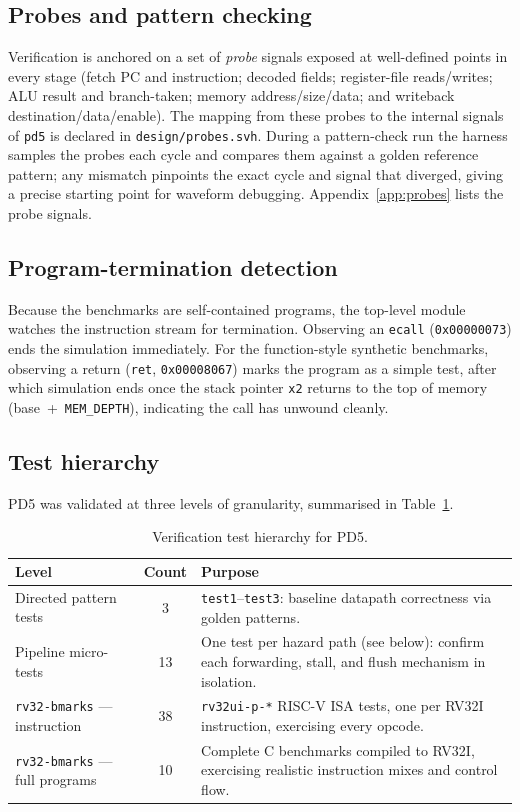 \documentclass[11pt,a4paper]{article}
\newcommand{\code}[1]{\texttt{#1}}          %
\newcommand{\sig}[1]{\texttt{#1}}
\newcommand{\hex}[1]{\texttt{0x#1}}
\begin{document}
\subsection{Probes and pattern checking}
Verification is anchored on a set of \emph{probe} signals exposed at well-defined points in
every stage (fetch PC and instruction; decoded fields; register-file reads/writes; ALU
result and branch-taken; memory address/size/data; and writeback destination/data/enable).
The mapping from these probes to the internal signals of \code{pd5} is declared in
\code{design/probes.svh}. During a pattern-check run the harness samples the probes each
cycle and compares them against a golden reference pattern; any mismatch pinpoints the
exact cycle and signal that diverged, giving a precise starting point for waveform
debugging. Appendix~\ref{app:probes} lists the probe signals.

\subsection{Program-termination detection}
Because the benchmarks are self-contained programs, the top-level module watches the
instruction stream for termination. Observing an \sig{ecall} (\hex{00000073}) ends the
simulation immediately. For the function-style synthetic benchmarks, observing a return
(\sig{ret}, \hex{00008067}) marks the program as a simple test, after which simulation ends
once the stack pointer \sig{x2} returns to the top of memory (base~+~\code{MEM\_DEPTH}),
indicating the call has unwound cleanly.

\subsection{Test hierarchy}
PD5 was validated at three levels of granularity, summarised in Table~\ref{tab:tests}.

\begin{table}[h]
\centering
\caption{Verification test hierarchy for PD5.}
\label{tab:tests}
\small
\begin{tabular}{@{}l c p{7.2cm}@{}}
\toprule
\textbf{Level} & \textbf{Count} & \textbf{Purpose} \\
\midrule
Directed pattern tests & 3 & \code{test1}--\code{test3}: baseline datapath correctness via golden patterns. \\
Pipeline micro-tests   & 13 & One test per hazard path (see below): confirm each forwarding, stall, and flush mechanism in isolation. \\
\code{rv32-bmarks} --- instruction & 38 & \code{rv32ui-p-*} RISC-V ISA tests, one per RV32I instruction, exercising every opcode. \\
\code{rv32-bmarks} --- full programs & 10 & Complete C benchmarks compiled to RV32I, exercising realistic instruction mixes and control flow. \\
\bottomrule
\end{tabular}
\end{table}
\end{document}

